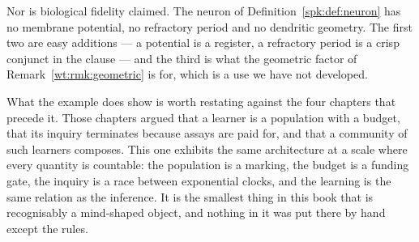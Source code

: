 Nor is biological fidelity claimed. The neuron of Definition~\ref{spk:def:neuron} has no
membrane potential, no refractory period and no dendritic geometry. The first two are easy
additions --- a potential is a register, a refractory period is a crisp conjunct in the
clause --- and the third is what the geometric factor of Remark~\ref{wt:rmk:geometric} is
for, which is a use we have not developed.

What the example does show is worth restating against the four chapters that precede it.
Those chapters argued that a learner is a population with a budget, that its inquiry
terminates because assays are paid for, and that a community of such learners composes.
This one exhibits the same architecture at a scale where every quantity is countable: the
population is a marking, the budget is a funding gate, the inquiry is a race between
exponential clocks, and the learning is the same relation as the inference. It is the
smallest thing in this book that is recognisably a mind-shaped object, and nothing in it
was put there by hand except the rules.


